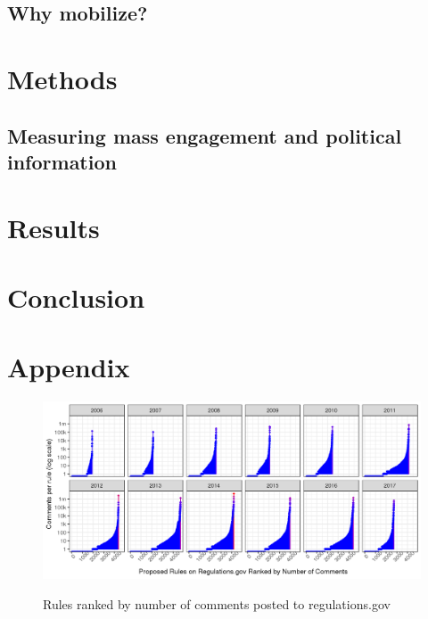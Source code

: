 \documentclass{article}
\begin{document}
\subsection{Why mobilize?} \label{whymail-intro}




\section{Methods}

\subsection{Measuring mass engagement and political information}
\label{whyMail-methods}



\section{Results}


\section{Conclusion}


\newpage
\section{Appendix}



\begin{figure}[h!]
    \centering
        \caption{Rules ranked by number of comments posted to regulations.gov}
    \includegraphics[width = 6.5in]{Figs/rules-ranked-comments-per-year-1.png}
    \label{fig:rules-ranked}
\end{figure}
\end{document}
